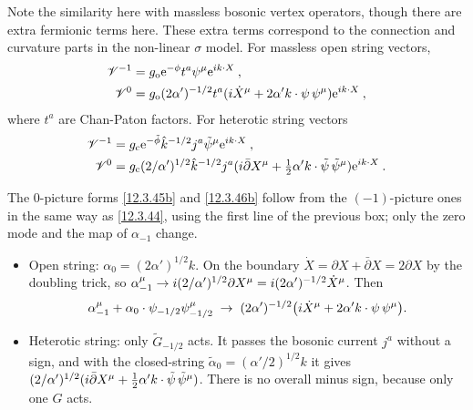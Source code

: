 Note the similarity here with massless bosonic vertex operators, though there are extra fermionic terms here. These extra terms correspond to the connection and curvature parts in the non-linear $\sigma$ model. For massless open string vectors,
\begin{subequations}
	\begin{align}
		\mathscr{V}^{{-}1} &= g_{\mathrm{o}}\mathrm{e}^{-\phi}t^{a}\psi^{\mu}\mathrm{e}^{i k\cdot X} \:, \label{12.3.45a} \\
		\mathscr{V}^{0} &= g_{\mathrm{o}}(2\alpha^{\prime})^{{-}1/2}t^{a}(i \dot{X}^{\mu}
		+2\alpha^{\prime}k\cdot\psi\,\psi^{\mu})\mathrm{e}^{i k\cdot X} \:, \label{12.3.45b}
	\end{align} \label{12.3.45}
\end{subequations}
where $t^{a}$ are Chan-Paton factors. For heterotic string vectors
\begin{subequations}
	\begin{align}
		\mathscr{V}^{{-}1} &= g_{\mathrm{c}}\mathrm{e}^{-\tilde{\phi}}\hat{k}^{{-}1/2}j^{a}\tilde{\psi}^{\mu}\mathrm{e}^{i k\cdot X} \:, \label{12.3.46a}\\
		\mathscr{V}^{0} &= g_{\mathrm{c}}(2/\alpha^{\prime})^{1/2}\hat{k}^{{-}1/2}j^{a}
		(i\bar{\partial}X^{\mu}+\tfrac{1}{2}\alpha^{\prime}k\cdot \tilde{\psi}\,\tilde{\psi}^{\mu})\mathrm{e}^{i k\cdot X}\:.
		\label{12.3.46b}
	\end{align} \label{12.3.46}
\end{subequations}
\begin{tcolorbox}[breakable]
	The 0-picture forms \eqref{12.3.45b} and \eqref{12.3.46b} follow from the $(-1)$-picture ones in the same way as \eqref{12.3.44}, using the first line of the previous box; only the zero mode and the map of $\alpha_{-1}$ change.
	\begin{itemize}
		\item Open string: $\alpha_{0}=(2\alpha')^{1/2}k$. On the boundary $\dot X=\partial X+\bar\partial X=2\partial X$ by the doubling trick, so $\alpha^{\mu}_{-1}\to i(2/\alpha')^{1/2}\partial X^{\mu}=i(2\alpha')^{-1/2}\dot X^{\mu}$. Then
		\[
		\alpha^{\mu}_{-1}+\alpha_{0}\cdot\psi_{-1/2}\psi^{\mu}_{-1/2}\;\to\;(2\alpha')^{-1/2}\bigl(i\dot X^{\mu}+2\alpha'k\cdot\psi\,\psi^{\mu}\bigr) .
		\]
		\item Heterotic string: only $\tilde G_{-1/2}$ acts. It passes the bosonic current $j^{a}$ without a sign, and with the closed-string $\tilde\alpha_{0}=(\alpha'/2)^{1/2}k$ it gives $(2/\alpha')^{1/2}(i\bar\partial X^{\mu}+\frac12\alpha'k\cdot\tilde\psi\,\tilde\psi^{\mu})$. There is no overall minus sign, because only one $G$ acts.
	\end{itemize}
\end{tcolorbox}
